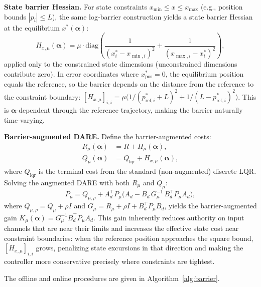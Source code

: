 \documentclass[letterpaper, 10pt, conference]{IEEEtran}
\newcommand{\balpha}{\bm{\alpha}}
\begin{document}
\textbf{State barrier Hessian.}
For state constraints $x_{\min} \leq x \leq x_{\max}$
(e.g., position bounds $|p_i| \leq L$),
the same log-barrier construction yields a state barrier Hessian
at the equilibrium $x^*(\balpha)$:
\begin{equation}\label{eq:barrier_hess_x}
  H_{x,\mu}(\balpha) = \mu \cdot \mathrm{diag}\!\left(
    \frac{1}{(x^*_i - x_{\min,i})^2}
    + \frac{1}{(x_{\max,i} - x^*_i)^2}
  \right),
\end{equation}
applied only to the constrained state dimensions
(unconstrained dimensions contribute zero).
In error coordinates where $x^*_{\mathrm{pos}} = 0$,
the equilibrium position equals the reference, so the
barrier depends on the distance from the reference to
the constraint boundary:
$[H_{x,\mu}]_{i,i} = \mu \bigl(
  1/(p^*_{\mathrm{ref},i} + L)^2 + 1/(L - p^*_{\mathrm{ref},i})^2
\bigr)$.
This is $\balpha$-dependent through the reference trajectory,
making the barrier naturally time-varying.

\textbf{Barrier-augmented DARE.}
Define the barrier-augmented costs:
\begin{align}
  R_\mu(\balpha) &= R + H_\mu(\balpha), \label{eq:R_barrier} \\
  Q_\mu(\balpha) &= Q_{\mathrm{lqr}} + H_{x,\mu}(\balpha), \label{eq:Q_barrier}
\end{align}
where $Q_{\mathrm{lqr}}$ is the terminal cost from the
standard (non-augmented) discrete LQR.
Solving the augmented DARE with both $R_\mu$ and $Q_\mu$:
\begin{equation}\label{eq:dare_barrier}
  P_\mu = Q_{\mu,\rho} + A_d^\top P_\mu \bigl(
    A_d - B_d \, G_\mu^{-1} \,
    B_d^\top P_\mu A_d \bigr),
\end{equation}
where $Q_{\mu,\rho} = Q_\mu + \rho I$ and
$G_\mu = R_\mu + \rho I + B_d^\top P_\mu B_d$,
yields the barrier-augmented gain
$K_\mu(\balpha) = G_\mu^{-1} B_d^\top P_\mu A_d$.
This gain inherently reduces authority on input channels
that are near their limits and increases the effective
state cost near constraint boundaries:
when the reference position approaches the square bound,
$[H_{x,\mu}]_{i,i}$ grows, penalizing state excursions
in that direction and making the controller more conservative
precisely where constraints are tightest.

The offline and online procedures are given
in Algorithm~\ref{alg:barrier}.
\end{document}
